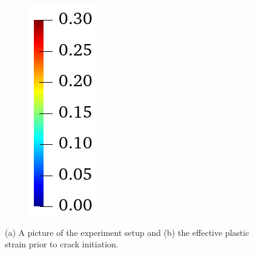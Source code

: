 \begin{figure}[!htb]
\begin{subfigure}[b]{0.06\textwidth}
    \includegraphics[width=\textwidth,scale=0.5]{Chapter5/figures/3pb/colorbar_ep}
    \vspace{1em}
  \end{subfigure}
  \label{fig: Chapter5/3pb/plastic_strain}
  \caption[A picture of the experiment setup and the effective plastic strain prior to crack initiation.]{(a) A picture of the experiment setup \cite{kubik2019ductile} and (b) the effective plastic strain prior to crack initiation. }
\end{figure}
